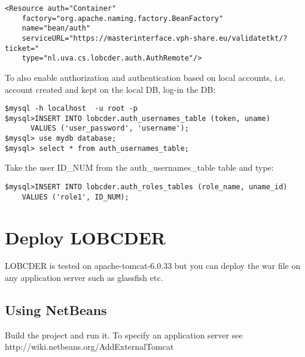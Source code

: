 \documentclass[a4paper,10pt]{article}
\begin{document}
\begin{lstlisting}
<Resource auth="Container" 
    factory="org.apache.naming.factory.BeanFactory" 
    name="bean/auth" 
    serviceURL="https://masterinterface.vph-share.eu/validatetkt/?ticket="
    type="nl.uva.cs.lobcder.auth.AuthRemote"/>  
\end{lstlisting}

To also enable authorization and authentication based on local accounts, i.e. account created and kept on the local DB, log-in the DB: 
\begin{lstlisting}
$mysql -h localhost  -u root -p
$mysql>INSERT INTO lobcder.auth_usernames_table (token, uname) 
      VALUES ('user_password', 'username');
$mysql> use mydb database;
$mysql> select * from auth_usernames_table;
\end{lstlisting}

Take the user ID\_NUM from the auth\_usernames\_table table and type:
\begin{lstlisting}
$mysql>INSERT INTO lobcder.auth_roles_tables (role_name, uname_id)
    VALUES ('role1', ID_NUM);
\end{lstlisting}

\section{Deploy LOBCDER}

LOBCDER is tested on apache-tomcat-6.0.33 but you can deploy the war file on any application server such as glassfish etc. 

\subsection{Using NetBeans}
Build the project and run it. To specify an application server see http://wiki.netbeans.org/AddExternalTomcat
\end{document}
